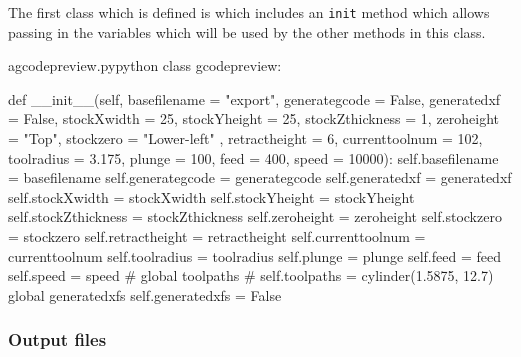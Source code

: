 \documentclass{ltxdoc}
\begin{document}
The first class which is defined is  which includes an \verb|init| method which allows passing in the variables which will be used by the other methods in this class.

\lstset{firstnumber=\thegcpy}
\begin{writecode}{a}{gcodepreview.py}{python}
class gcodepreview:

    def __init__(self, basefilename = "export", 
                 generategcode = False,
                 generatedxf = False,
                 stockXwidth = 25, 
                 stockYheight = 25, 
                 stockZthickness = 1, 
                 zeroheight = "Top", 
                 stockzero = "Lower-left" , 
                 retractheight = 6, 
                 currenttoolnum = 102,
                 toolradius = 3.175,
                 plunge = 100,
                 feed = 400,
                 speed = 10000):
        self.basefilename = basefilename
        self.generategcode = generategcode
        self.generatedxf = generatedxf
        self.stockXwidth = stockXwidth
        self.stockYheight = stockYheight
        self.stockZthickness = stockZthickness
        self.zeroheight = zeroheight
        self.stockzero = stockzero
        self.retractheight = retractheight
        self.currenttoolnum = currenttoolnum
        self.toolradius = toolradius
        self.plunge = plunge
        self.feed = feed
        self.speed = speed
#        global toolpaths
#        self.toolpaths = cylinder(1.5875, 12.7)
        global generatedxfs
        self.generatedxfs = False
        
\end{writecode}
\addtocounter{gcpy}{35}

%
%

\subsubsection{Output files}
\end{document}
